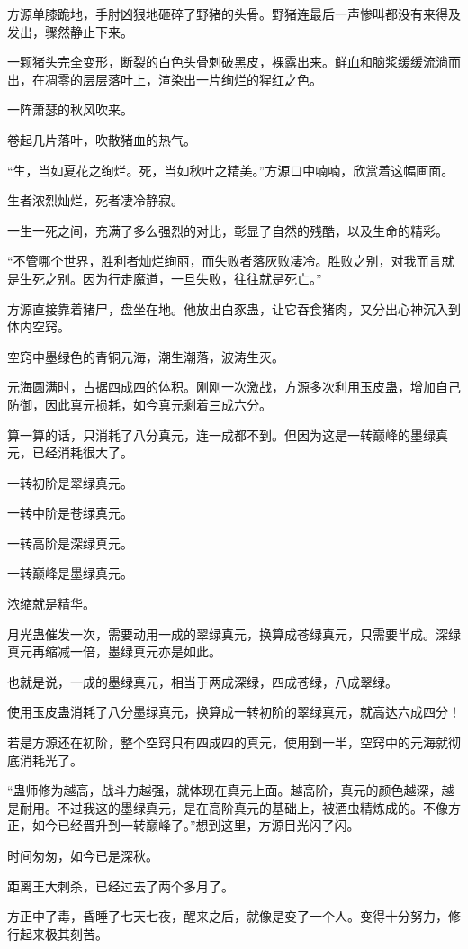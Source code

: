 \begin{this_body}
方源单膝跪地，手肘凶狠地砸碎了野猪的头骨。野猪连最后一声惨叫都没有来得及发出，骤然静止下来。

一颗猪头完全变形，断裂的白色头骨刺破黑皮，裸露出来。鲜血和脑浆缓缓流淌而出，在凋零的层层落叶上，渲染出一片绚烂的猩红之色。

一阵萧瑟的秋风吹来。

卷起几片落叶，吹散猪血的热气。

“生，当如夏花之绚烂。死，当如秋叶之精美。”方源口中喃喃，欣赏着这幅画面。

生者浓烈灿烂，死者凄冷静寂。

一生一死之间，充满了多么强烈的对比，彰显了自然的残酷，以及生命的精彩。

“不管哪个世界，胜利者灿烂绚丽，而失败者落灰败凄冷。胜败之别，对我而言就是生死之别。因为行走魔道，一旦失败，往往就是死亡。”

方源直接靠着猪尸，盘坐在地。他放出白豕蛊，让它吞食猪肉，又分出心神沉入到体内空窍。

空窍中墨绿色的青铜元海，潮生潮落，波涛生灭。

元海圆满时，占据四成四的体积。刚刚一次激战，方源多次利用玉皮蛊，增加自己防御，因此真元损耗，如今真元剩着三成六分。

算一算的话，只消耗了八分真元，连一成都不到。但因为这是一转巅峰的墨绿真元，已经消耗很大了。

一转初阶是翠绿真元。

一转中阶是苍绿真元。

一转高阶是深绿真元。

一转巅峰是墨绿真元。

浓缩就是精华。

月光蛊催发一次，需要动用一成的翠绿真元，换算成苍绿真元，只需要半成。深绿真元再缩减一倍，墨绿真元亦是如此。

也就是说，一成的墨绿真元，相当于两成深绿，四成苍绿，八成翠绿。

使用玉皮蛊消耗了八分墨绿真元，换算成一转初阶的翠绿真元，就高达六成四分！

若是方源还在初阶，整个空窍只有四成四的真元，使用到一半，空窍中的元海就彻底消耗光了。

“蛊师修为越高，战斗力越强，就体现在真元上面。越高阶，真元的颜色越深，越是耐用。不过我这的墨绿真元，是在高阶真元的基础上，被酒虫精炼成的。不像方正，如今已经晋升到一转巅峰了。”想到这里，方源目光闪了闪。

时间匆匆，如今已是深秋。

距离王大刺杀，已经过去了两个多月了。

方正中了毒，昏睡了七天七夜，醒来之后，就像是变了一个人。变得十分努力，修行起来极其刻苦。


\end{this_body}
